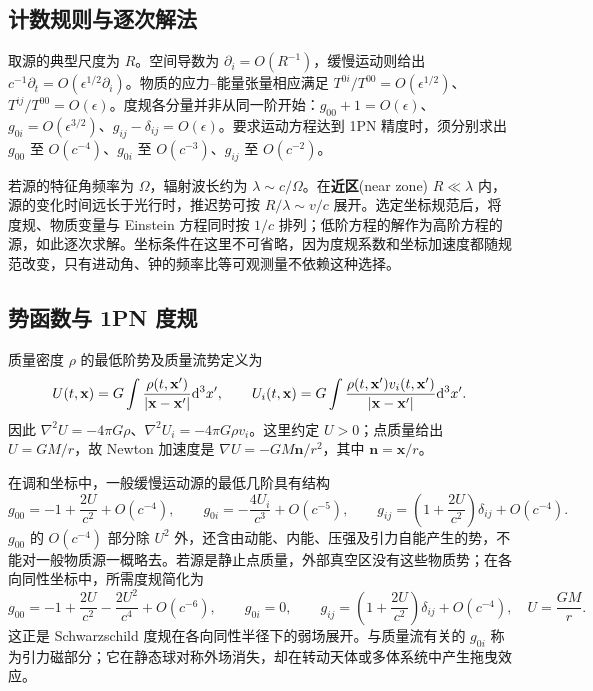 \subsection{计数规则与逐次解法}

取源的典型尺度为 $R$。空间导数为 $\partial_i=O(R^{-1})$，缓慢运动则给出 $c^{-1}\partial_t=O(\epsilon^{1/2}\partial_i)$。物质的应力--能量张量相应满足 $T^{0i}/T^{00}=O(\epsilon^{1/2})$、$T^{ij}/T^{00}=O(\epsilon)$。度规各分量并非从同一阶开始：$g_{00}+1=O(\epsilon)$、$g_{0i}=O(\epsilon^{3/2})$、$g_{ij}-\delta_{ij}=O(\epsilon)$。要求运动方程达到 1PN 精度时，须分别求出 $g_{00}$ 至 $O(c^{-4})$、$g_{0i}$ 至 $O(c^{-3})$、$g_{ij}$ 至 $O(c^{-2})$。

若源的特征角频率为 $\Omega$，辐射波长约为 $\lambda\sim c/\Omega$。在\textbf{近区}(near zone) $R\ll\lambda$ 内，源的变化时间远长于光行时，推迟势可按 $R/\lambda\sim v/c$ 展开。选定坐标规范后，将度规、物质变量与 Einstein 方程同时按 $1/c$ 排列；低阶方程的解作为高阶方程的源，如此逐次求解。坐标条件在这里不可省略，因为度规系数和坐标加速度都随规范改变，只有进动角、钟的频率比等可观测量不依赖这种选择。

\subsection{势函数与 1PN 度规}

质量密度 $\rho$ 的最低阶势及质量流势定义为
\[
    U(t,\mathbf x)=G\int\frac{\rho(t,\mathbf x')}{|\mathbf x-\mathbf x'|}\dd^3x',\qquad
    U_i(t,\mathbf x)=G\int\frac{\rho(t,\mathbf x')v_i(t,\mathbf x')}{|\mathbf x-\mathbf x'|}\dd^3x'.
\]
因此 $\nabla^2U=-4\pi G\rho$、$\nabla^2U_i=-4\pi G\rho v_i$。这里约定 $U>0$；点质量给出 $U=GM/r$，故 Newton 加速度是 $\nabla U=-GM\mathbf n/r^2$，其中 $\mathbf n=\mathbf x/r$。

在调和坐标中，一般缓慢运动源的最低几阶具有结构
\[
    g_{00}=-1+\frac{2U}{c^2}+O(c^{-4}),\qquad
    g_{0i}=-\frac{4U_i}{c^3}+O(c^{-5}),\qquad
    g_{ij}=\left(1+\frac{2U}{c^2}\right)\delta_{ij}+O(c^{-4}).
\]
$g_{00}$ 的 $O(c^{-4})$ 部分除 $U^2$ 外，还含由动能、内能、压强及引力自能产生的势，不能对一般物质源一概略去。若源是静止点质量，外部真空区没有这些物质势；在各向同性坐标中，所需度规简化为
\[
    g_{00}=-1+\frac{2U}{c^2}-\frac{2U^2}{c^4}+O(c^{-6}),\qquad
    g_{0i}=0,\qquad
    g_{ij}=\left(1+\frac{2U}{c^2}\right)\delta_{ij}+O(c^{-4}),
    \quad U=\frac{GM}{r}.
\]
这正是 Schwarzschild 度规在各向同性半径下的弱场展开。与质量流有关的 $g_{0i}$ 称为引力磁部分；它在静态球对称外场消失，却在转动天体或多体系统中产生拖曳效应。

